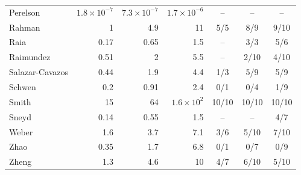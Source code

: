 \begin{longtable}{@{}lrrrccc@{}}
Perelson & $1.8\times10^{-7}$ & $7.3\times10^{-7}$ & $1.7\times10^{-6}$ & -- & -- & -- \\
Rahman & 1 & 4.9 & 11 & 5/5 & 8/9 & 9/10 \\
Raia & 0.17 & 0.65 & 1.5 & -- & 3/3 & 5/6 \\
Raimundez & 0.51 & 2 & 5.5 & -- & 2/10 & 4/10 \\
Salazar-Cavazos & 0.44 & 1.9 & 4.4 & 1/3 & 5/9 & 5/9 \\
Schwen & 0.2 & 0.91 & 2.4 & 0/1 & 0/4 & 1/9 \\
Smith & 15 & 64 & $1.6\times10^{2}$ & 10/10 & 10/10 & 10/10 \\
Sneyd & 0.14 & 0.55 & 1.5 & -- & -- & 4/7 \\
Weber & 1.6 & 3.7 & 7.1 & 3/6 & 5/10 & 7/10 \\
Zhao & 0.35 & 1.7 & 6.8 & 0/1 & 0/7 & 0/9 \\
Zheng & 1.3 & 4.6 & 10 & 4/7 & 6/10 & 5/10 \\
\bottomrule
\end{longtable}
